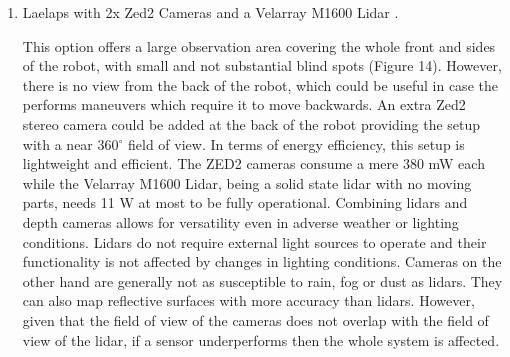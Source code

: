 \documentclass{article}
\begin{document}
\begin{enumerate}
\item Laelaps with 2x Zed2 Cameras \cite{noauthor_zed_nodate} and a Velarray M1600 Lidar \cite{noauthor_velarray_nodate}.

This option offers a large observation area covering the whole front and sides of the robot, with small and not substantial blind spots (Figure 14). However, there is no view from the back of the robot, which could be useful in case the performs maneuvers which require it to move backwards. An extra Zed2 stereo camera could be added at the back of the robot providing the setup with a near 360$^{\circ}$ field of view.
In terms of energy efficiency, this setup is lightweight and efficient. The ZED2 cameras consume a mere 380 mW each while the Velarray M1600 Lidar, being a solid state lidar with no moving parts, needs 11 W at most to be fully operational. Combining lidars and depth cameras allows for versatility even in adverse weather or lighting conditions. Lidars do not require external light sources to operate and their functionality is not affected by changes in lighting conditions. Cameras on the other hand are generally not as susceptible to rain, fog or dust as lidars. They can also map reflective surfaces with more accuracy than lidars. However, given that the field of view of the cameras does not overlap with the field of view of the lidar, if a sensor underperforms then the whole system is affected. 


\end{enumerate}
\end{document}
